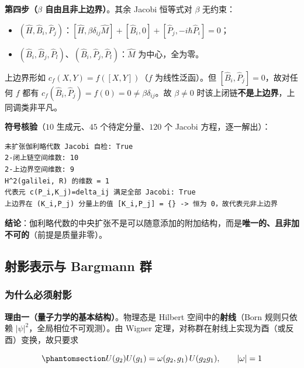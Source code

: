 \documentclass[
  chinese,
  a4paper,
  UTF8,
  12pt,
  oneside,
  openany]{ctexbook}
\providecommand{\tightlist}{%
  \setlength{\itemsep}{0pt}\setlength{\parskip}{0pt}}
\theoremstyle{plain}
\theoremstyle{plain}
\theoremstyle{plain}
\theoremstyle{definition}
\theoremstyle{plain}
\theoremstyle{plain}
\theoremstyle{remark}
\begin{document}
\textbf{第四步（\(\beta\) 自由且非上边界）}。其余 Jacobi 恒等式对
\(\beta\) 无约束：

\begin{itemize}
\tightlist
\item
  \((\hat H,\hat B_i,\hat P_j)\)：\([\hat H,\beta\delta_{ij}\hat M]+[\hat B_i,0]+[\hat P_j,-i\hbar\hat P_i]=0\)；
\item
  \((\hat B_i,\hat B_j,\hat P_l)\)、\((\hat B_i,\hat P_j,\hat P_l)\)：\(\hat M\)
  为中心，全为零。
\end{itemize}

上边界形如 \(c_f(X,Y)=f([X,Y])\)（\(f\) 为线性泛函）。但
\([\hat B_i,\hat P_j]=0\)，故对任何 \(f\) 都有
\(c_f(\hat B_i,\hat P_j)=f(0)=0\neq\beta\delta_{ij}\)。故 \(\beta\neq0\)
时该上闭链\textbf{不是上边界}，上同调类非平凡。

\textbf{符号核验}（\(10\) 生成元、\(45\) 个待定分量、\(120\) 个 Jacobi
方程，逐一解出）：

\begin{verbatim}
未扩张伽利略代数 Jacobi 自检: True
2-闭上链空间维数: 10
2-上边界空间维数: 9
H^2(galilei, R) 的维数 = 1
代表元 c(P_i,K_j)=delta_ij 满足全部 Jacobi: True
上边界在 (K_i,P_j) 分量上的值 [K_i,P_j] = {} -> 恒为 0，故代表元非上边界
\end{verbatim}

\textbf{结论}：伽利略代数的中央扩张不是可以随意添加的附加结构，而是\textbf{唯一的、且非加不可的}（前提是质量非零）。

\subsection{射影表示与 Bargmann
群}\label{ux5c04ux5f71ux8868ux793aux4e0e-bargmann-ux7fa4}

\subsubsection{为什么必须射影}\label{ux4e3aux4ec0ux4e48ux5fc5ux987bux5c04ux5f71}

\textbf{理由一（量子力学的基本结构）}。物理态是 Hilbert
空间中的\textbf{射线}（Born 规则只依赖
\(\lvert\psi\rvert^{2}\)，全局相位不可观测）。由 Wigner
定理，对称群在射线上实现为酉（或反酉）变换，故只要求

\begin{equation}\protect\phantomsection\label{eq-qp-projective}{
U(g_2)U(g_1)=\omega(g_2,g_1)\,U(g_2g_1),\qquad \lvert\omega\rvert=1
}\end{equation}
\end{document}
